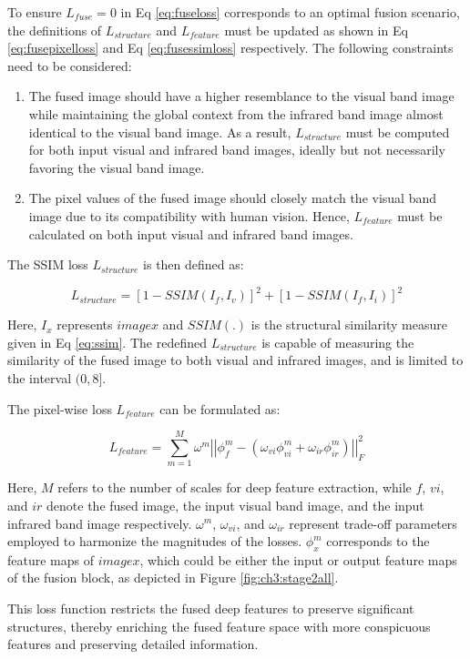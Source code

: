 To ensure $L_{fuse} = 0 $ in Eq \ref{eq:fuseloss} corresponds to an optimal fusion scenario, the definitions of $L_{structure}$ and $L_{feature}$ must be updated as shown in Eq \ref{eq:fusepixelloss} and Eq \ref{eq:fusessimloss} respectively. The following constraints need to be considered:

\begin{enumerate}
    \item The fused image should have a higher resemblance to the visual band image while maintaining the global context from the infrared band image almost identical to the visual band image. As a result, $L_{structure}$ must be computed for both input visual and infrared band images, ideally but not necessarily favoring the visual band image.
    \item The pixel values of the fused image should closely match the visual band image due to its compatibility with human vision. Hence, $L_{feature}$ must be calculated on both input visual and infrared band images.
\end{enumerate}

The SSIM loss $L_{structure}$ is then defined as:

\begin{equation} \label{eq:fusessimloss}
    L_{structure} = \left[1- SSIM(I_{f},I_{v})\right]^2 + \left[1- SSIM(I_{f},I_{i})\right]^2
\end{equation}

Here, $I_x$ represents $image x$ and $SSIM(.)$ is the structural similarity measure \cite{ma2015perceptual} given in Eq \ref{eq:ssim}. The redefined $L_{structure}$ is capable of measuring the similarity of the fused image to both visual and infrared images, and is limited to the interval $(0,8]$.

The pixel-wise loss $L_{feature}$ can be formulated as:

\begin{equation} \label{eq:fusepixelloss}
    L_{feature} = \sum_{m=1}^{M} \omega^m \left\lvert \left\lvert \phi_f^m - \left(\omega_{vi}\phi_{vi}^{m} + \omega_{ir}\phi_{ir}^{m}\right) \right\rvert \right\rvert _{F}^{2}
\end{equation}

Here, $M$ refers to the number of scales for deep feature extraction, while $f$, $vi$, and $ir$ denote the fused image, the input visual band image, and the input infrared band image respectively. $\omega^m$, $\omega_{vi}$, and $\omega_{ir}$ represent trade-off parameters employed to harmonize the magnitudes of the losses. $\phi_{x}^{m}$ corresponds to the feature maps of $image x$, which could be either the input or output feature maps of the fusion block, as depicted in Figure \ref{fig:ch3:stage2all}.

This loss function restricts the fused deep features to preserve significant structures, thereby enriching the fused feature space with more conspicuous features and preserving detailed information.